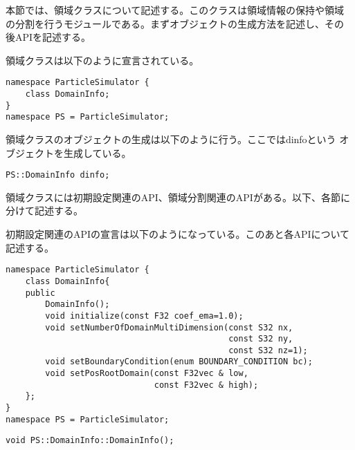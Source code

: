 本節では、領域クラスについて記述する。このクラスは領域情報の保持や領域
の分割を行うモジュールである。まずオブジェクトの生成方法を記述し、その
後APIを記述する。


領域クラスは以下のように宣言されている。
\begin{lstlisting}[caption=DomainInfo0]
namespace ParticleSimulator {
    class DomainInfo;
}
namespace PS = ParticleSimulator;
\end{lstlisting}

領域クラスのオブジェクトの生成は以下のように行う。ここではdinfoという
オブジェクトを生成している。
\begin{screen}
\begin{verbatim}
PS::DomainInfo dinfo;
\end{verbatim}
\end{screen}


領域クラスには初期設定関連のAPI、領域分割関連のAPIがある。以下、各節に
分けて記述する。


初期設定関連のAPIの宣言は以下のようになっている。このあと各APIについて
記述する。
\begin{lstlisting}[caption=DomainInfo1]
namespace ParticleSimulator {
    class DomainInfo{
    public
        DomainInfo();
        void initialize(const F32 coef_ema=1.0);
        void setNumberOfDomainMultiDimension(const S32 nx,
                                             const S32 ny,
                                             const S32 nz=1);
        void setBoundaryCondition(enum BOUNDARY_CONDITION bc);
        void setPosRootDomain(const F32vec & low,
                              const F32vec & high);
    };
}
namespace PS = ParticleSimulator;
\end{lstlisting}


\begin{screen}
\begin{verbatim}
void PS::DomainInfo::DomainInfo();
\end{verbatim}
\end{screen}

